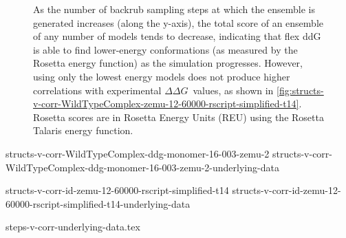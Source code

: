 \documentclass[journal=jpcbfk,manuscript=suppinfo]{achemso}
\newcommand\ddg{$\Delta\Delta G$}
\begin{document}
\begin{figure}
{    As the number of backrub sampling steps at which the ensemble is generated increases (along the y-axis), the total score of an ensemble of any number of models tends to decrease, indicating that flex ddG is able to find lower-energy conformations (as measured by the Rosetta energy function) as the simulation progresses. However, using only the lowest energy models does not produce higher correlations with experimental \ddg\ values, as shown in \cref{fig:structs-v-corr-WildTypeComplex-zemu-12-60000-rscript-simplified-t14}.
    Rosetta scores are in Rosetta Energy Units (REU) using the Rosetta Talaris energy function\cite{song_structure-guided_2011,shapovalov_smoothed_2011,omeara_combined_2015}.
  } \label{fig:wildtypecomplex-scores-complete}
\end{figure}

{structs-v-corr-WildTypeComplex-ddg-monomer-16-003-zemu-2}
\clearpage
  {\small
    {structs-v-corr-WildTypeComplex-ddg-monomer-16-003-zemu-2-underlying-data}
  }
\clearpage

{structs-v-corr-id-zemu-12-60000-rscript-simplified-t14}
\clearpage
  {\small
    {structs-v-corr-id-zemu-12-60000-rscript-simplified-t14-underlying-data}
  }
\clearpage

{\small
  {steps-v-corr-underlying-data.tex}
}
\end{document}
